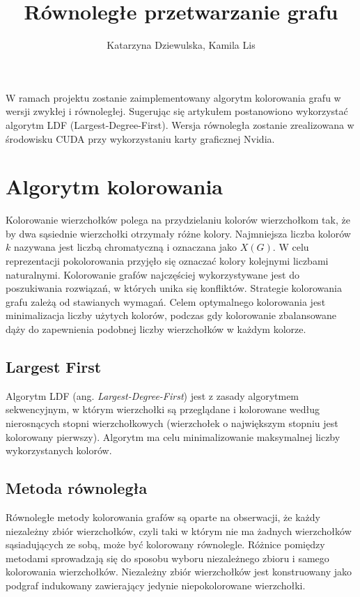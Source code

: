 \documentclass{article}
\date{}
\author{Katarzyna Dziewulska, Kamila Lis}
\title{Równoległe przetwarzanie grafu}
\begin{document}
	\maketitle
	W ramach projektu zostanie zaimplementowany algorytm kolorowania grafu w wersji zwykłej i równoległej. Sugerując się artykułem \cite{article} postanowiono wykorzystać algorytm LDF (Largest-Degree-First). Wersja równoległa zostanie zrealizowana w środowisku CUDA przy wykorzystaniu karty graficznej Nvidia.\\
	
	\section{Algorytm kolorowania}
	Kolorowanie wierzchołków polega na  przydzielaniu kolorów wierzchołkom tak, że by dwa sąsiednie wierzchołki otrzymały różne kolory. Najmniejsza liczba kolorów $k$ nazywana jest liczbą chromatyczną i oznaczana jako $X(G)$. W celu reprezentacji pokolorowania przyjęło się oznaczać kolory kolejnymi liczbami naturalnymi. Kolorowanie grafów najczęściej wykorzystywane jest do poszukiwania rozwiązań, w których unika się konfliktów. Strategie kolorowania grafu zależą od stawianych wymagań. Celem optymalnego kolorowania jest minimalizacja liczby użytych kolorów, podczas gdy kolorowanie zbalansowane dąży do zapewnienia podobnej liczby wierzchołków w każdym kolorze.
	\subsection{Largest First}
	Algorytm LDF (ang. \textit{Largest-Degree-First}) jest z zasady algorytmem sekwencyjnym, w którym wierzchołki są przeglądane i kolorowane według nierosnących stopni wierzchołkowych (wierzchołek o największym stopniu jest kolorowany pierwszy). Algorytm ma celu minimalizowanie maksymalnej liczby wykorzystanych kolorów.
	
	\subsection{Metoda równoległa}
	Równoległe metody kolorowania grafów są oparte na obserwacji, że każdy niezależny zbiór wierzchołków, czyli taki w którym nie ma żadnych wierzchołków sąsiadujących ze sobą, może być kolorowany równolegle. Różnice pomiędzy metodami sprowadzają się do sposobu wyboru niezależnego zbioru i samego kolorowania wierzchołków. Niezależny zbiór wierzchołków jest konstruowany jako podgraf indukowany zawierający jedynie niepokolorowane wierzchołki.
	
\end{document}
